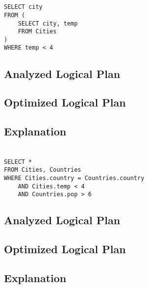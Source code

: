 \documentclass[12pt]{article}
\begin{document}
\newpage

\section{}
\begin{verbatim}
SELECT city
FROM (
    SELECT city, temp
    FROM Cities
)
WHERE temp < 4
\end{verbatim}

\subsection*{Analyzed Logical Plan}
\vspace{2in}

\subsection*{Optimized Logical Plan}
\vspace{2in}

\subsection*{Explanation}

\newpage

\section{}
\begin{verbatim}
SELECT *
FROM Cities, Countries
WHERE Cities.country = Countries.country
    AND Cities.temp < 4
    AND Countries.pop > 6
\end{verbatim}

\subsection*{Analyzed Logical Plan}
\vspace{2in}

\subsection*{Optimized Logical Plan}
\vspace{2in}

\subsection*{Explanation}

\newpage
\end{document}
